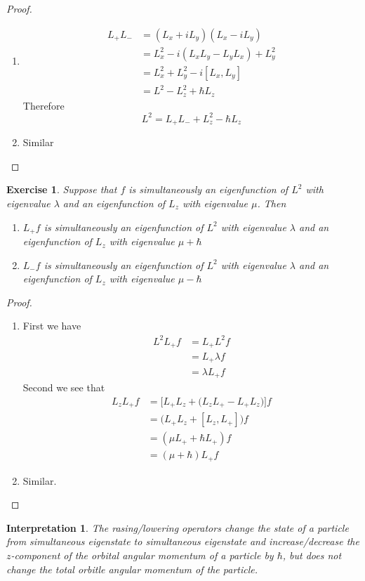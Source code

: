 \documentclass[12pt]{amsart}
\newtheorem{intp}[thm]{Interpretation}
\newtheorem{ex}[thm]{Exercise}
\newcommand{\lam}{\lambda}
\begin{document}
\begin{proof}\
\begin{enumerate}
\item \begin{align*}
L_+L_- 
&= (L_x + i L_y)(L_x - iL_y)\\
&= L_x^2 - i(L_xL_y - L_y L_x) + L_y^2\\
&= L_x^2 + L_y^2 - i[L_x, L_y]\\
&= L^2 - L_z^2  + \hbar L_z
\end{align*}
Therefore $$L^2 = L_+L_- + L_z^2 - \hbar L_z$$
\item Similar
\end{enumerate}
\end{proof}

\begin{ex}
Suppose that $f$ is simultaneously an eigenfunction of $L^2$ with eigenvalue $\lam$ and an eigenfunction of $L_z$ with eigenvalue $\mu$. Then 
\begin{enumerate}
\item $L_+f$ is simultaneously an eigenfunction of $L^2$ with eigenvalue $\lam$ and an eigenfunction of $L_z$ with eigenvalue $\mu + \hbar$
\item  $L_-f$ is simultaneously an eigenfunction of $L^2$ with eigenvalue $\lam$ and an eigenfunction of $L_z$ with eigenvalue $ \mu - \hbar$
\end{enumerate}
\end{ex}

\begin{proof}\
\begin{enumerate}
\item  First we have
\begin{align*}
L^2L_+f 
&= L_+L^2 f\\
&= L_+ \lam f \\
&= \lam L_+ f
\end{align*}
Second we see that
\begin{align*}
L_zL_+f 
&= \bigg[ L_+L_z + \big(L_zL_+ - L_+L_z\big) \bigg]f \\
&= \big(L_+L_z + [L_z, L_+] \big)f \\
&= (\mu L_+ + \hbar L_+)f \\
&= (\mu + \hbar )L_+f  
\end{align*}
\item Similar.
\end{enumerate}
\end{proof}

\begin{intp}
The rasing/lowering operators change the state of a particle from simultaneous eigenstate to simultaneous eigenstate and increase/decrease the $z$-component of the orbital angular momentum of a particle by $\hbar$, but does not change the total orbitle angular momentum of the particle. 
\end{intp}
\end{document}
